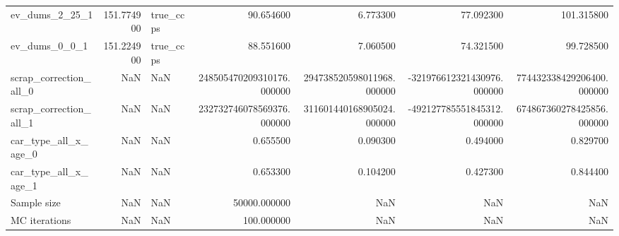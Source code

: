 \begin{tabular}{lrlrrrr}
ev_dums_2_25_1 & 151.774900 & true_ccps & 90.654600 & 6.773300 & 77.092300 & 101.315800 \\
ev_dums_0_0_1 & 151.224900 & true_ccps & 88.551600 & 7.060500 & 74.321500 & 99.728500 \\
scrap_correction_all_0 & NaN & NaN & 248505470209310176.000000 & 294738520598011968.000000 & -321976612321430976.000000 & 774432338429206400.000000 \\
scrap_correction_all_1 & NaN & NaN & 232732746078569376.000000 & 311601440168905024.000000 & -492127785551845312.000000 & 674867360278425856.000000 \\
car_type_all_x_age_0 & NaN & NaN & 0.655500 & 0.090300 & 0.494000 & 0.829700 \\
car_type_all_x_age_1 & NaN & NaN & 0.653300 & 0.104200 & 0.427300 & 0.844400 \\
Sample size & NaN & NaN & 50000.000000 & NaN & NaN & NaN \\
MC iterations & NaN & NaN & 100.000000 & NaN & NaN & NaN \\
\bottomrule
\end{tabular}
